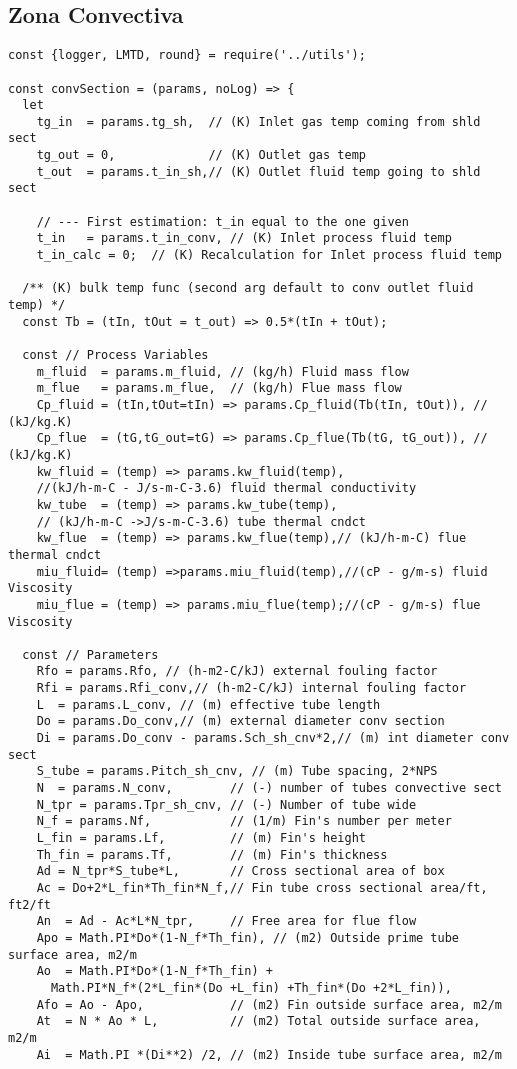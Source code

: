 \subsection{Zona Convectiva}
\begin{verbatim}
const {logger, LMTD, round} = require('../utils');

const convSection = (params, noLog) => {
  let
    tg_in  = params.tg_sh,  // (K) Inlet gas temp coming from shld sect
    tg_out = 0,             // (K) Outlet gas temp
    t_out  = params.t_in_sh,// (K) Outlet fluid temp going to shld sect

    // --- First estimation: t_in equal to the one given
    t_in   = params.t_in_conv, // (K) Inlet process fluid temp
    t_in_calc = 0;  // (K) Recalculation for Inlet process fluid temp

  /** (K) bulk temp func (second arg default to conv outlet fluid temp) */
  const Tb = (tIn, tOut = t_out) => 0.5*(tIn + tOut);

  const // Process Variables
    m_fluid  = params.m_fluid, // (kg/h) Fluid mass flow
    m_flue   = params.m_flue,  // (kg/h) Flue mass flow
    Cp_fluid = (tIn,tOut=tIn) => params.Cp_fluid(Tb(tIn, tOut)), // (kJ/kg.K)
    Cp_flue  = (tG,tG_out=tG) => params.Cp_flue(Tb(tG, tG_out)), // (kJ/kg.K)
    kw_fluid = (temp) => params.kw_fluid(temp),
    //(kJ/h-m-C - J/s-m-C-3.6) fluid thermal conductivity
    kw_tube  = (temp) => params.kw_tube(temp),
    // (kJ/h-m-C ->J/s-m-C-3.6) tube thermal cndct
    kw_flue  = (temp) => params.kw_flue(temp),// (kJ/h-m-C) flue thermal cndct
    miu_fluid= (temp) =>params.miu_fluid(temp),//(cP - g/m-s) fluid Viscosity
    miu_flue = (temp) => params.miu_flue(temp);//(cP - g/m-s) flue Viscosity

  const // Parameters
    Rfo = params.Rfo, // (h-m2-C/kJ) external fouling factor
    Rfi = params.Rfi_conv,// (h-m2-C/kJ) internal fouling factor
    L  = params.L_conv, // (m) effective tube length
    Do = params.Do_conv,// (m) external diameter conv section
    Di = params.Do_conv - params.Sch_sh_cnv*2,// (m) int diameter conv sect
    S_tube = params.Pitch_sh_cnv, // (m) Tube spacing, 2*NPS
    N  = params.N_conv,        // (-) number of tubes convective sect
    N_tpr = params.Tpr_sh_cnv, // (-) Number of tube wide
    N_f = params.Nf,           // (1/m) Fin's number per meter
    L_fin = params.Lf,         // (m) Fin's height
    Th_fin = params.Tf,        // (m) Fin's thickness
    Ad = N_tpr*S_tube*L,       // Cross sectional area of box
    Ac = Do+2*L_fin*Th_fin*N_f,// Fin tube cross sectional area/ft, ft2/ft
    An  = Ad - Ac*L*N_tpr,     // Free area for flue flow
    Apo = Math.PI*Do*(1-N_f*Th_fin), // (m2) Outside prime tube surface area, m2/m
    Ao  = Math.PI*Do*(1-N_f*Th_fin) +
      Math.PI*N_f*(2*L_fin*(Do +L_fin) +Th_fin*(Do +2*L_fin)),
    Afo = Ao - Apo,            // (m2) Fin outside surface area, m2/m
    At  = N * Ao * L,          // (m2) Total outside surface area, m2/m
    Ai  = Math.PI *(Di**2) /2, // (m2) Inside tube surface area, m2/m


\end{verbatim}
